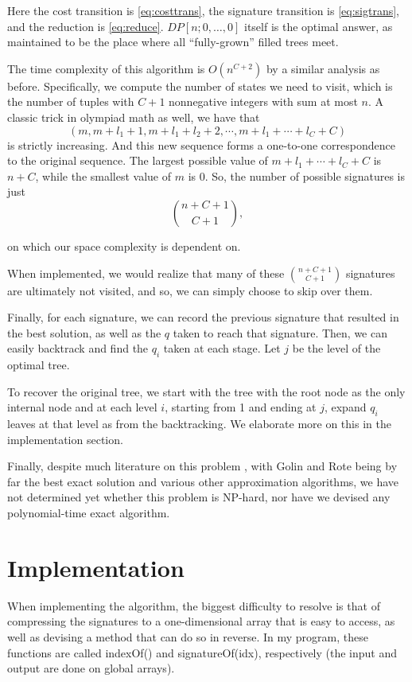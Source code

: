 \documentclass[a4paper,10pt,english]{scrartcl}
\begin{document}
Here the cost transition is \eqref{eq:costtrans}, the signature transition is \eqref{eq:sigtrans}, and the reduction is \eqref{eq:reduce}. $DP[n; 0, \ldots, 0]$ itself is the optimal answer, as maintained to be the place where all ``fully-grown'' filled trees meet.

The time complexity of this algorithm is $O(n^{C+2})$ by a similar analysis as before. Specifically, we compute the number of states we need to visit, which is the number of tuples with $C+1$ nonnegative integers with sum at most $n$. A classic trick in olympiad math as well, we have that $$(m, m+l_1+1, m+l_1+l_2+2, \cdots , m+l_1+\cdots+l_C+C)$$ is strictly increasing. And this new sequence forms a one-to-one correspondence to the original sequence. The largest possible value of $m+l_1+\cdots+l_C+C$ is $n+C$, while the smallest value of $m$ is 0. So, the number of possible signatures is just $$\binom{n+C+1}{C+1},$$

on which our space complexity is dependent on.

When implemented, we would realize that many of these $\binom{n+C+1}{C+1}$ signatures are ultimately not visited, and so, we can simply choose to skip over them.

Finally, for each signature, we can record the previous signature that resulted in the best solution, as well as the $q$ taken to reach that signature. Then, we can easily backtrack and find the $q_i$ taken at each stage. Let $j$ be the level of the optimal tree.

To recover the original tree, we start with the tree with the root node as the only internal node and at each level $i$, starting from 1 and ending at $j$, expand $q_i$ leaves at that level as from the backtracking. We elaborate more on this in the implementation section.

Finally, despite much literature on this problem \cite{Karp1961, GolinKenyonYoung2002, GolinLi2008}, with Golin and Rote \cite{GolinRote1998} being by far the best exact solution and various other approximation algorithms, we have not determined yet whether this problem is NP-hard, nor have we devised any polynomial-time exact algorithm.

\section{Implementation}\label{sec:impl}

When implementing the algorithm, the biggest difficulty to resolve is that of compressing the signatures to a one-dimensional array that is easy to access, as well as devising a method that can do so in reverse. In my program, these functions are called indexOf() and signatureOf(idx), respectively (the input and output are done on global arrays).
\end{document}
